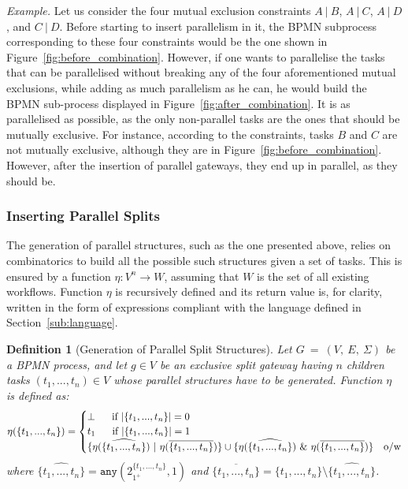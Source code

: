 \documentclass{article}
\newcommand{\anyof}[2]{\ensuremath{\mathtt{any}(#1, #2)}}
\newcommand{\cardof}[1]{\lvert #1 \rvert}
\newcommand{\example}{\textit{Example. }}
\newcommand{\graph}{G~=~(V,~E,~\Sigma)}
\newcommand{\mutex}[2]{\ensuremath{#1\ \vert\ #2}}
\newtheorem{definition}{Definition}
\begin{document}
	\example Let us consider the four mutual exclusion constraints \mutex{A}{B}, \mutex{A}{C}, \mutex{A}{D}, and \mutex{C}{D}.
	Before starting to insert parallelism in it, the BPMN subprocess corresponding to these four constraints would be the one shown in Figure~\ref{fig:before_combination}.
	However, if one wants to parallelise the tasks that can be parallelised without breaking any of the four aforementioned mutual exclusions, while adding as much parallelism as he can, he would build the BPMN sub-process displayed in Figure~\ref{fig:after_combination}.
	It is as parallelised as possible, as the only non-parallel tasks are the ones that should be mutually exclusive.
	For instance, according to the constraints, tasks $B$ and $C$ are not mutually exclusive, although they are in Figure~\ref{fig:before_combination}.
	However, after the insertion of parallel gateways, they end up in parallel, as they should be.

	
	\subsubsection{Inserting Parallel Splits}
	
	The generation of parallel structures, such as the one presented above, relies on combinatorics to build all the possible such structures given a set of tasks.
	This is ensured by a function $\eta : V^n \rightarrow W$, assuming that $W$ is the set of all existing workflows.
	Function $\eta$ is recursively defined and its return value is, for clarity, written in the form of expressions compliant with the language defined in Section~\ref{sub:language}.
	
	\begin{definition}[Generation of Parallel Split Structures]
		Let $\graph$ be a BPMN process, and let $g \in V$ be an exclusive split gateway having $n$ children tasks $(t_1, ..., t_n) \in V$ whose parallel structures have to be generated.
		Function $\eta$ is defined as:
		\begin{equation*}
			\eta(\{t_1, ..., t_n\}) =
			\begin{cases}
				\bot \ \ \ \ \ \textnormal{if}\ \cardof{\{t_1, ..., t_n\}} = 0  &	\\
				t_1 \ \ \ \ \ \textnormal{if}\ \cardof{\{t_1, ..., t_n\}} = 1	& 	\\
				\{\eta(\widehat{\{t_1, ..., t_n\}})\ \vert\ \eta(\overline{\{t_1, ..., t_n\}})\} \cup \{\eta(\widehat{\{t_1, ..., t_n\}})\ \&\ \eta(\overline{\{t_1, ..., t_n\}})\} & \textnormal{o/w}	 		
			\end{cases}
		\end{equation*}
		where $\widehat{\{t_1, ..., t_n\}} = \anyof{2_{1^+}^{\{t_1, ..., t_n\}}}{1}$ and $\overline{\{t_1, ..., t_n\}} = \{t_1, ..., t_n\} \setminus \widehat{\{t_1, ..., t_n\}}$.
	\end{definition}
	
\end{document}
